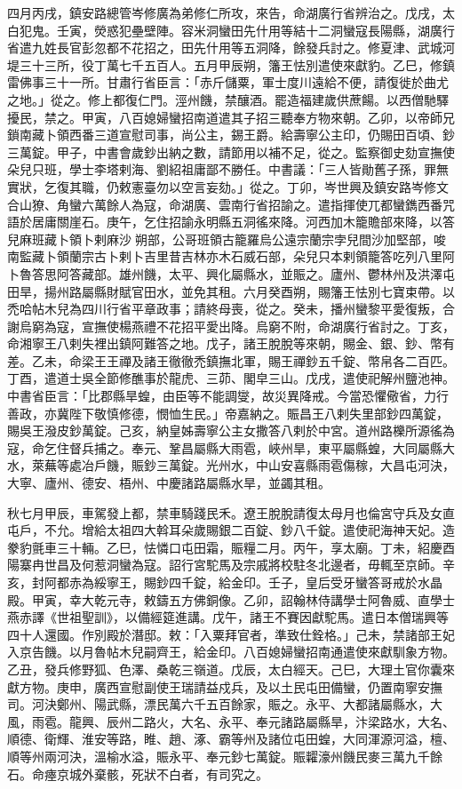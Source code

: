 \begin{pinyinscope}
 四月丙戌，鎮安路總管岑修廣為弟修仁所攻，來告，命湖廣行省辨治之。戊戌，太白犯鬼。壬寅，熒惑犯壘壁陣。容米洞蠻田先什用等結十二洞蠻寇長陽縣，湖廣行省遣九姓長官彭忽都不花招之，田先什用等五洞降，餘發兵討之。修夏津、武城河堤三十三所，役丁萬七千五百人。五月甲辰朔，籓王怯別遣使來獻豹。乙巳，修鎮雷佛事三十一所。甘肅行省臣言：「赤斤儲粟，軍士度川遠給不便，請復徙於曲尤之地。」從之。修上都復仁門。涇州饑，禁釀酒。罷造福建歲供蔗餳。以西僧馳驛擾民，禁之。甲寅，八百媳婦蠻招南道遣其子招三聽奉方物來朝。乙卯，以帝師兄鎖南藏卜領西番三道宣慰司事，尚公主，錫王爵。給壽寧公主印，仍賜田百頃、鈔三萬錠。甲子，中書會歲鈔出納之數，請節用以補不足，從之。監察御史劾宣撫使朵兒只班，學士李塔剌海、劉紹祖庸鄙不勝任。中書議：「三人皆勛舊子孫，罪無實狀，乞復其職，仍敕憲臺勿以空言妄劾。」從之。丁卯，岑世興及鎮安路岑修文合山獠、角蠻六萬餘人為寇，命湖廣、雲南行省招諭之。遣指揮使兀都蠻鐫西番咒語於居庸關崖石。庚午，乞住招諭永明縣五洞徭來降。河西加木籠贍部來降，以答兒麻班藏卜領卜剌麻沙朔部，公哥班領古籠羅烏公遠宗蘭宗孛兒間沙加堅部，唆南監藏卜領蘭宗古卜剌卜吉里昔吉林亦木石威石部，朵兒只本剌領籠答吃列八里阿卜魯答思阿答藏部。雄州饑，太平、興化屬縣水，並賑之。廬州、鬱林州及洪澤屯田旱，揚州路屬縣財賦官田水，並免其租。六月癸酉朔，賜籓王怯別七寶束帶。以禿哈帖木兒為四川行省平章政事；請終母喪，從之。癸未，播州蠻黎平愛復叛，合謝烏窮為寇，宣撫使楊燕禮不花招平愛出降。烏窮不附，命湖廣行省討之。丁亥，命湘寧王八剌失裡出鎮阿難答之地。戊子，諸王脫脫等來朝，賜金、銀、鈔、幣有差。乙未，命梁王王禪及諸王徹徹禿鎮撫北軍，賜王禪鈔五千錠、幣帛各二百匹。丁酉，遣道士吳全節修醮事於龍虎、三茆、閣皁三山。戊戌，遣使祀解州鹽池神。中書省臣言：「比郡縣旱蝗，由臣等不能調燮，故災異降戒。今當恐懼儆省，力行善政，亦冀陛下敬慎修德，憫恤生民。」帝嘉納之。賑昌王八剌失里部鈔四萬錠，賜吳王潑皮鈔萬錠。己亥，納皇姊壽寧公主女撒答八剌於中宮。道州路櫟所源徭為寇，命乞住督兵捕之。奉元、鞏昌屬縣大雨雹，峽州旱，東平屬縣蝗，大同屬縣大水，萊蕪等處冶戶饑，賑鈔三萬錠。光州水，中山安喜縣雨雹傷稼，大昌屯河決，大寧、廬州、德安、梧州、中慶諸路屬縣水旱，並蠲其租。



 秋七月甲辰，車駕發上都，禁車騎踐民禾。遼王脫脫請復太母月也倫宮守兵及女直屯戶，不允。增給太祖四大斡耳朵歲賜銀二百錠、鈔八千錠。遣使祀海神天妃。造豢豹氈車三十輛。乙巳，怯憐口屯田霜，賑糧二月。丙午，享太廟。丁未，紹慶酉陽寨冉世昌及何惹洞蠻為寇。詔行宮駝馬及宗戚將校駐冬北邊者，毋輒至京師。辛亥，封阿都赤為綏寧王，賜鈔四千錠，給金印。壬子，皇后受牙蠻答哥戒於水晶殿。甲寅，幸大乾元寺，敕鑄五方佛銅像。乙卯，詔翰林侍講學士阿魯威、直學士燕赤譯《世祖聖訓》，以備經筵進講。戊午，諸王不賽因獻駝馬。遣日本僧瑞興等四十人還國。作別殿於潛邸。敕：「入粟拜官者，準致仕銓格。」己未，禁諸部王妃入京告饑。以月魯帖木兒嗣齊王，給金印。八百媳婦蠻招南通遣使來獻馴象方物。乙丑，發兵修野狐、色澤、桑乾三嶺道。戊辰，太白經天。己巳，大理土官你囊來獻方物。庚申，廣西宣慰副使王瑞請益戍兵，及以土民屯田備蠻，仍置南寧安撫司。河決鄭州、陽武縣，漂民萬六千五百餘家，賑之。永平、大都諸屬縣水，大風，雨雹。龍興、辰州二路火，大名、永平、奉元諸路屬縣旱，汴梁路水，大名、順德、衛輝、淮安等路，睢、趙、涿、霸等州及諸位屯田蝗，大同渾源河溢，檀、順等州兩河決，溫榆水溢，賑永平、奉元鈔七萬錠。賑糶濠州饑民麥三萬九千餘石。命瘞京城外棄骸，死狀不白者，有司究之。




\end{pinyinscope}
